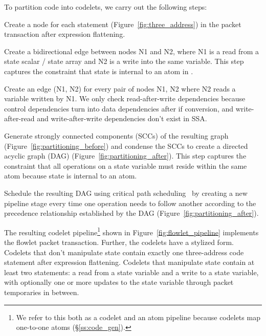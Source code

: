 To partition code into codelets, we carry out the following steps:
\begin{CompactEnumerate}
  \item Create a node for each statement (Figure~\ref{fig:three_address}) in
    the packet transaction after expression flattening.
  \item Create a bidirectional edge between nodes N1 and N2, where N1 is a read from a
    state scalar / state array and N2 is a write into the same variable.
    This step captures the constraint that state is internal to an
    atom in \absmachine.
  \item Create an edge (N1, N2) for every pair of nodes N1, N2 where N2 reads a
    variable written by N1. We only check read-after-write dependencies because
    control dependencies turn into data dependencies after if conversion, and
    write-after-read and write-after-write dependencies don't exist in SSA.
  \item Generate strongly connected components (SCCs) of the resulting graph
    (Figure~\ref{fig:partitioning_before}) and condense the SCCs to create a
    directed acyclic graph (DAG) (Figure~\ref{fig:partitioning_after}). This
    step captures the constraint that all operations on a state variable
    must reside within the same atom because state is internal to an atom.
  \item Schedule the resulting DAG using critical path
    scheduling~\cite{crit_path_sched} by creating a new pipeline stage every time
    one operation needs to follow another according to the precedence relationship
    established by the DAG (Figure~\ref{fig:partitioning_after}).
\end{CompactEnumerate}
The resulting codelet pipeline\footnote{We refer to this both as a codelet and
an atom pipeline because codelets map one-to-one atoms (\S\ref{ss:code_gen}).}
shown in Figure~\ref{fig:flowlet_pipeline} implements the flowlet packet
transaction.  Further, the codelets have a stylized form.  Codelets that don't
manipulate state contain exactly one three-address code statement after
expression flattening. Codelets that manipulate state contain at least two
statements: a read from a state variable and a write to a state variable, with
optionally one or more updates to the state variable through packet temporaries
in between.


